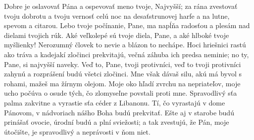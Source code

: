 Dobre je oslavovať Pána
a ospevovať meno tvoje, Najvyšší;
\versseparator
za rána zvestovať tvoju dobrotu
a tvoju vernosť celú noc
\versseparator
na desaťstrunovej harfe a na lutne,
spevom a citarou.
\versseparator
Lebo tvoje počínanie, Pane, ma napĺňa radosťou
a plesám nad dielami tvojich rúk.
\versseparator
Aké veľkolepé sú tvoje diela, Pane,
a aké hlboké tvoje myšlienky!
\versseparator
Nerozumný človek to nevie
a blázon to nechápe.
\versseparator
Hoci hriešnici rastú ako tráva
a kadejakí zločinci prekvitajú,
\versseparator
večná záhuba ich predsa neminie;
no ty, Pane, si najvyšší naveky.
\versseparator
Veď to, Pane, tvoji protivníci,
veď to tvoji protivníci zahynú
a rozprášení budú všetci zločinci.
\versseparator
Mne však dávaš silu, akú má byvol s rohami,
mažeš ma žírnym olejom.
\versseparator
Moje oko hľadí zvrchu na nepriateľov,
moje ucho počúva o osude tých, čo zlomyseľne povstali proti mne.
\versseparator
Spravodlivý sťa palma zakvitne
a vyrastie sťa céder z Libanonu.
\versseparator
Tí, čo vyrastajú v dome Pánovom,
v nádvoriach nášho Boha budú prekvitať.
\versseparator
Ešte aj v starobe budú prinášať ovocie,
úrodní budú a plní sviežosti;
\versseparator
a tak zvestujú, že Pán, moje útočište, je spravodlivý
a neprávosti v ňom niet.